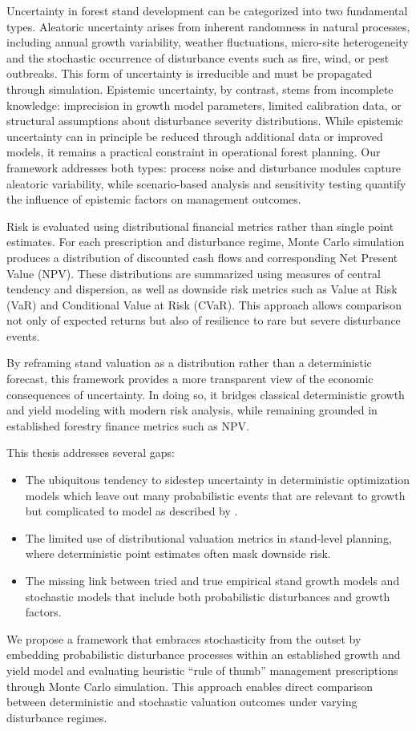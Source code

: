 \documentclass[12pt]{report}
\begin{document}
Uncertainty in forest stand development can be categorized into two fundamental types. Aleatoric uncertainty arises from inherent randomness in natural processes, including annual growth variability, weather fluctuations, micro-site heterogeneity and the stochastic occurrence of disturbance events such as fire, wind, or pest outbreaks. This form of uncertainty is irreducible and must be propagated through simulation. Epistemic uncertainty, by contrast, stems from incomplete knowledge: imprecision in growth model parameters, limited calibration data, or structural assumptions about disturbance severity distributions. While epistemic uncertainty can in principle be reduced through additional data or improved models, it remains a practical constraint in operational forest planning. Our framework addresses both types: process noise and disturbance modules capture aleatoric variability, while scenario-based analysis and sensitivity testing quantify the influence of epistemic factors on management outcomes.

Risk is evaluated using distributional financial metrics rather than single point estimates. For each prescription and disturbance regime, Monte Carlo simulation produces a distribution of discounted cash flows and corresponding Net Present Value (NPV). These distributions are summarized using measures of central tendency and dispersion, as well as downside risk metrics such as Value at Risk (VaR) and Conditional Value at Risk (CVaR). This approach allows comparison not only of expected returns but also of resilience to rare but severe disturbance events.

By reframing stand valuation as a distribution rather than a deterministic forecast, this framework provides a more transparent view of the economic consequences of uncertainty. In doing so, it bridges classical deterministic growth and yield modeling with modern risk analysis, while remaining grounded in established forestry finance metrics such as NPV.

This thesis addresses several gaps: 
\begin{itemize}
\item The ubiquitous tendency to sidestep uncertainty in deterministic optimization models which leave out many probabilistic events that are relevant to growth but complicated to model as described by \textcite{stevensOptimalHarvestRates1986}.
\item The limited use of distributional valuation metrics in stand-level planning, where deterministic point estimates often mask downside risk.
\item The missing link between tried and true empirical stand growth models \parencite{pmrcHarrisonYieldPredictionGrowth1996} and stochastic models that include both probabilistic disturbances and growth factors.
\end{itemize}
We propose a framework that embraces stochasticity from the outset by embedding probabilistic disturbance processes within an established growth and yield model and evaluating heuristic ``rule of thumb'' management prescriptions through Monte Carlo simulation. This approach enables direct comparison between deterministic and stochastic valuation outcomes under varying disturbance regimes.
\end{document}
